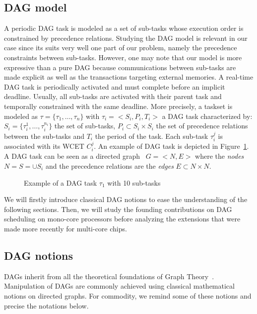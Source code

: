 \documentclass[main.tex]{subfiles}
\begin{document}
\subsection{DAG model}
 A periodic DAG task is modeled as a set of sub-tasks whose execution order is
 constrained by precedence relations. Studying the DAG model is relevant in our
 case since its suits very well one part of our problem, namely the precedence
 constraints between sub-tasks. However, one may note that our model is more
 expressive than a pure DAG because communications between sub-tasks are made
 explicit as well as the transactions targeting external memories. A real-time
 DAG task is periodically activated and must complete before an implicit
 deadline. Usually, all sub-tasks are activated with their parent task and
 temporally constrained with the same deadline. More precisely, a taskset is
 modeled as $\tau = \{ \tau_1 , \ldots , \tau_n \}$ with $\tau_i = <S_i, P_i,
 T_i>$ a DAG task characterized by:
        $S_i = \{ \tau_i^1 , \ldots , \tau_i^{n_i} \}$ the set of sub-tasks, 
        $P_i \subset S_i \times S_i$ the set of precedence relations between
        the sub-tasks and 
        $T_i$ the period of the task. Each sub-task $\tau_i^j$ is associated
        with its WCET $C_i^j$. An example of DAG task is depicted in
        Figure~\ref{fig_stateOfTheArt_2_DAGTask}. A DAG task can be seen as a
        directed graph~\cite{BangJensen2008} $G = <N,E>$ where the \emph{nodes}
        $N = S = \cup S_i$ and the precedence relations are the \emph{edges} $E
        \subset N \times N$.

\begin{figure}
    \centering
    
    \caption{Example of a DAG task $\tau_1$ with 10 sub-tasks}
    \label{fig_stateOfTheArt_2_DAGTask}
\end{figure}


We will firstly introduce classical DAG notions to ease the understanding of
the following sections. Then, we will study the founding contributions on DAG
scheduling on mono-core processors before analyzing the extensions that were
made more recently for multi-core chips.

\subsection{DAG notions}
DAGs inherit from all the theoretical foundations of Graph
Theory~\cite{BangJensen2008}. Manipulation of DAGs are commonly achieved using
classical mathematical notions on directed graphs. For commodity, we remind
some of these notions and precise the notations below.
\end{document}

